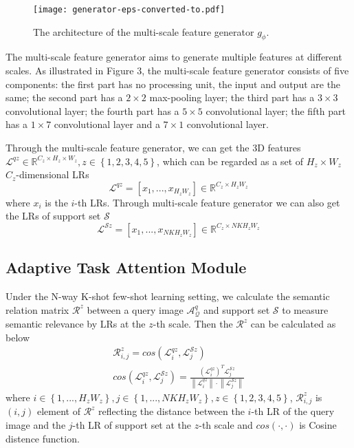\documentclass[final]{cvpr}
\begin{document}
	\begin{figure}[t]
		\centering
		\texttt{[image: generator-eps-converted-to.pdf]}
		\caption{The architecture of the multi-scale feature generator $g_{\phi}$. }
		\label{generator}
	\end{figure}
	
	The multi-scale feature generator aims to generate multiple features at different scales. As illustrated in Figure 3, the multi-scale feature generator consists of five components: the first part has no processing unit, the input and output are the same; the second part has a $2\times2$ max-pooling layer; the third part has a $3\times3$ convolutional layer; the fourth part has a $5\times5$ convolutional layer; the fifth part has a $1\times7$ convolutional layer and a $7\times1$ convolutional layer. 
	
	Through the multi-scale feature generator, we can get the 3D features  $\mathcal{L}^{qz}\in\mathbb{R}^{C_z\times H_z\times W_z} ,z\in\left\{1,2,3,4,5\right\}$, which can be regarded as a set of $H_z\times W_z$ $C_z$-dimensional LRs
	\begin{equation} 
		\mathcal{L}^{qz}=[x_1,...,x_{H_zW_z}]\in\mathbb{R}^{C_z\times H_zW_z} 
	\end{equation}
	where $x_{i}$ is the $i$-th LRs. Through multi-scale feature generator we can also get the LRs of support set $\mathcal{S}$ 
	\begin{equation} 
		\mathcal{L}^{\mathcal{S}z}=[x_1,...,x_{NKH_zW_z}]\in\mathbb{R}^{C_z\times NKH_zW_z} 
	\end{equation}
	
	\subsection{Adaptive Task Attention Module}
	Under the N-way K-shot few-shot learning setting, we calculate the semantic relation matrix $\mathcal{R}^z$ between a query image $\mathcal{A}^q_\mathcal{Q}$ and support set $\mathcal{S}$ to measure semantic relevance by LRs at the $z$-th scale. Then the $\mathcal{R}^z$ can be calculated as below
	\begin{gather}
		\mathcal{R}_{i,j}^z = cos(\mathcal{L}^{qz}_i,\mathcal{L}^{\mathcal{S}z}_j)
		\\
		cos(\mathcal{L}^{qz} _i,\mathcal{L}^{\mathcal{S}z}_j) =
		\frac{(\mathcal{L}^{qz} _i)^T\mathcal{L}^{\mathcal{S}z}_j}
		{
			\left\|\mathcal{L}^{qz} _i \right\| \cdot  \left\|\mathcal{L}^{\mathcal{S}z}_j\right\|} 	
	\end{gather}
	where $i\in\left\{1,...,H_zW_z\right\}, j\in\left\{1,...,NKH_zW_z\right\}, z\in\left\{1,2,3,4,5\right\}$,  $\mathcal{R}^z_{i,j}$ is $(i,j)$ element of $\mathcal{R}^z$ reflecting the distance between the $i$-th LR of the query image and the $j$-th LR of support set at the $z$-th scale and $cos (\cdot, \cdot)$ is Cosine  distence function. 
	
\end{document}
